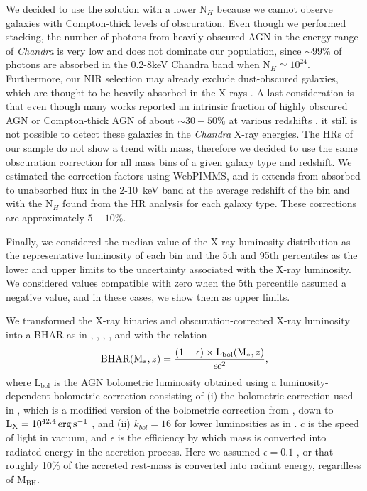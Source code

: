 We decided to use the solution with a lower N$_H$ because we cannot observe galaxies with Compton-thick levels of obscuration. Even though we performed stacking, the number of photons from heavily obscured AGN in the energy range of \textit{Chandra} is very low and does not dominate our population, since $\sim99\%$ of photons are absorbed in the 0.2-8keV Chandra band when N$_H\simeq10^{24}$. Furthermore, our NIR selection may already exclude dust-obscured galaxies, which are thought to be heavily absorbed in the X-rays \citep{2008ApJ...672...94F, 2016A&A...592A.109C, 2019AJ....157..233R}. A last consideration is that even though many works reported an intrinsic fraction of highly obscured AGN or Compton-thick AGN of about $\sim30-50\%$ at various redshifts \citep{2014ApJ...786..104U, 2014MNRAS.445.3557V,2015ApJ...815L..13R,2019ApJ...871..240A}, it still is not possible to detect these galaxies in the \textit{Chandra} X-ray energies.
The HRs of our sample do not show a trend with mass, therefore we decided to use the same obscuration correction for all mass bins of a given galaxy type and redshift.
We estimated the correction factors using WebPIMMS, and it extends from absorbed to unabsorbed flux in the 2-10~keV band at the average redshift of the bin and with the N$_H$ found from the HR analysis for each galaxy type. These corrections are approximately $5-10\%$.

Finally, we considered the median value of the X-ray luminosity distribution as the representative luminosity of each bin and the 5th and 95th percentiles as the lower and upper limits to the uncertainty associated with the X-ray luminosity. We considered values compatible with zero when the 5th percentile assumed a negative value, and in these cases, we show them as upper limits. 




We transformed the X-ray binaries and obscuration-corrected X-ray luminosity into a BHAR as in \citet{2008MNRAS.388.1011M}, \citet{2012ApJ...753L..30M}, \citet{2014MNRAS.439.2736D}, \citet{2015ApJ...800L..10R}, and \citet{2018ApJ...857...64B} with the relation
\begin{equation}  \label{eq:BHAR}
\centering
\text{BHAR}(\text{M}_*,z)=\frac{(1-\epsilon)\times\text{L}_{\text{bol}}(\text{M}_*,z)}{\epsilon c^2},
\end{equation}
where L$_{\text{bol}}$ is the AGN bolometric luminosity obtained using a luminosity-dependent bolometric correction consisting of (i) the bolometric correction used in \citet{2018MNRAS.475.1887Y}, which is a modified version of the bolometric correction from \citet{2012MNRAS.425..623L}, down to $\text{L}_\text{X}=10^{42.4} \,\mathrm{erg}\,\mathrm{s}^{-1}$ , and (ii) $k_{bol}=16$ for lower luminosities as in \citet{2017ApJ...842..131S}.
$c$ is the speed of light in vacuum, and $\epsilon$ is the efficiency by which mass is converted into radiated energy in the accretion process. Here we assumed $\epsilon=0.1$ \citep[e.g.,][]{2004MNRAS.351..169M, 2012ApJ...753L..30M, 2015ApJ...800L..10R, 2018ApJ...857...64B}, or that roughly 10\% of the accreted rest-mass is converted into radiant energy, regardless of M$_\text{BH}$.

